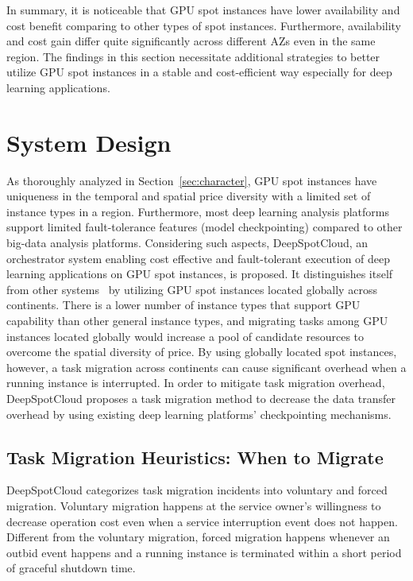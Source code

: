 \documentclass[conference]{IEEEtran}
\begin{document}
In summary, it is noticeable that GPU spot instances have lower availability and cost benefit comparing to other types of spot instances. Furthermore, availability and cost gain differ quite significantly across different AZs even in the same region. The findings in this section necessitate additional strategies to better utilize GPU spot instances in a stable and cost-efficient way especially for deep learning applications. 

\section{System Design}
As thoroughly analyzed in Section~\ref{sec:character}, GPU spot instances have uniqueness in the temporal and spatial price diversity with a limited set of instance types in a region. Furthermore, most deep learning analysis platforms support limited fault-tolerance features (model checkpointing) compared to other big-data analysis platforms. Considering such aspects, DeepSpotCloud, an orchestrator system enabling cost effective and fault-tolerant execution of deep learning applications on GPU spot instances, is proposed. It distinguishes itself from other systems~\cite{flint,spotcheck,see-spot-run} by utilizing GPU spot instances located globally across continents. There is a lower number of instance types that support GPU capability than other general instance types, and migrating tasks among GPU instances located globally would increase a pool of candidate resources to overcome the spatial diversity of price. By using globally located spot instances, however, a task migration across continents can cause significant overhead when a running instance is interrupted. In order to mitigate task migration overhead, DeepSpotCloud proposes a task migration method to decrease the data transfer overhead by using existing deep learning platforms' checkpointing mechanisms.

\subsection{Task Migration Heuristics: When to Migrate}
DeepSpotCloud categorizes task migration incidents into voluntary and forced migration. Voluntary migration happens at the service owner's willingness to decrease operation cost even when a service interruption event does not happen. Different from the voluntary migration, forced migration happens whenever an outbid event happens and a running instance is terminated within a short period of graceful shutdown time.
\end{document}

